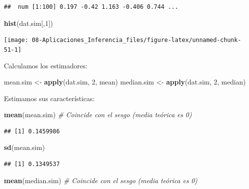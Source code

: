 \documentclass[]{book}
\newenvironment{Shaded}{\begin{snugshade}}{\end{snugshade}}
\newcommand{\KeywordTok}[1]{\textcolor[rgb]{0.13,0.29,0.53}{\textbf{#1}}}
\newcommand{\DecValTok}[1]{\textcolor[rgb]{0.00,0.00,0.81}{#1}}
\newcommand{\StringTok}[1]{\textcolor[rgb]{0.31,0.60,0.02}{#1}}
\newcommand{\CommentTok}[1]{\textcolor[rgb]{0.56,0.35,0.01}{\textit{#1}}}
\newcommand{\NormalTok}[1]{#1}
\theoremstyle{definition}
\theoremstyle{definition}
\theoremstyle{definition}
\theoremstyle{remark}
\begin{document}
\begin{enumerate}
\begin{verbatim}
##  num [1:100] 0.197 -0.42 1.163 -0.406 0.744 ...
\end{verbatim}

\begin{Shaded}
\begin{Highlighting}[]
\KeywordTok{hist}\NormalTok{(dat.sim[,}\DecValTok{1}\NormalTok{])}
\end{Highlighting}
\end{Shaded}

  \begin{center}\texttt{[image: 08-Aplicaciones\_Inferencia\_files/figure-latex/unnamed-chunk-51-1]} \end{center}

  Calculamos los estimadores:

\begin{Shaded}
\begin{Highlighting}[]
\NormalTok{mean.sim <-}\StringTok{ }\KeywordTok{apply}\NormalTok{(dat.sim, }\DecValTok{2}\NormalTok{, mean)}
\NormalTok{median.sim <-}\StringTok{ }\KeywordTok{apply}\NormalTok{(dat.sim, }\DecValTok{2}\NormalTok{, median)}
\end{Highlighting}
\end{Shaded}

  Estimamos sus características:

\begin{Shaded}
\begin{Highlighting}[]
\KeywordTok{mean}\NormalTok{(mean.sim) }\CommentTok{# Coincide con el sesgo (media teórica es 0)}
\end{Highlighting}
\end{Shaded}

\begin{verbatim}
## [1] 0.1459986
\end{verbatim}

\begin{Shaded}
\begin{Highlighting}[]
\KeywordTok{sd}\NormalTok{(mean.sim)}
\end{Highlighting}
\end{Shaded}

\begin{verbatim}
## [1] 0.1349537
\end{verbatim}

\begin{Shaded}
\begin{Highlighting}[]
\KeywordTok{mean}\NormalTok{(median.sim) }\CommentTok{# Coincide con el sesgo (media teórica es 0)}
\end{Highlighting}
\end{Shaded}


\end{enumerate}
\end{document}
